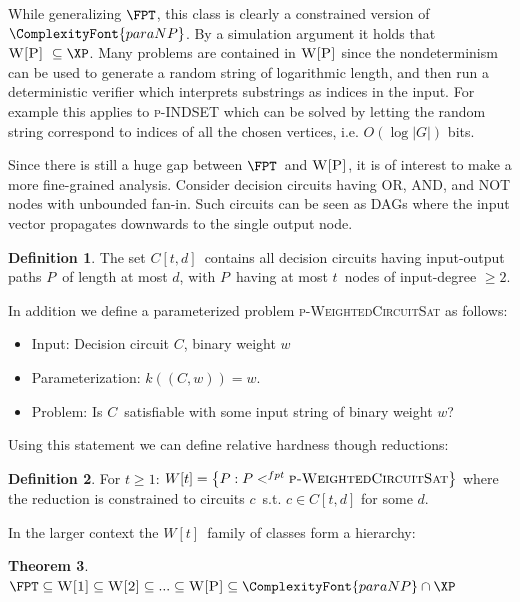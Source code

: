 \documentclass[a4paper,11pt]{report}
\theoremstyle{plain}
\newtheorem{thm}{Theorem}[chapter] %
\theoremstyle{definition}
\newtheorem{defn}[thm]{Definition} %
\newcommand{\PARANP}{\ComplexityFont{paraNP}}
\begin{document}
While generalizing $\FPT$, this class is clearly a constrained version of $\PARANP$.
By a simulation argument \cite{FG06} it holds that $\textsc{W[P]} \subseteq \XP$.
Many problems are contained in $\textsc{W[P]}$ since the nondeterminism can be used to generate a random string of logarithmic length, and then run a deterministic verifier which
interprets substrings as indices in the input.
For example this applies to \textsc{p-INDSET} which can be solved by letting the random string correspond to indices of all the chosen vertices, i.e. $O(\log |G|)$ bits.

Since there is still a huge gap between $\FPT$ and $\textsc{W[P]}$, it is of interest to make a more fine-grained analysis.
Consider decision circuits having OR, AND, and NOT nodes with unbounded fan-in.
Such circuits can be seen as DAGs where the input vector propagates downwards to the single output node.

\begin{defn}
The set $C[t, d]$ contains all decision circuits having input-output paths $P$ of length at most $d$, with $P$ having at most $t$ nodes of input-degree $\ge 2$.
\end{defn}

In addition we define a parameterized problem \textsc{p-WeightedCircuitSat} as follows:
\begin{itemize}
\item Input: Decision circuit $C$, binary weight $w$
\item Parameterization: $k((C, w)) = w$.
\item Problem: Is $C$ satisfiable with some input string of binary weight $w$?
\end{itemize}

Using this statement we can define relative hardness though reductions:

\begin{defn}
For $t \ge 1$: $W[t] = \left\{P : P <^{fpt} \textsc{p-WeightedCircuitSat} \right\}$ where the reduction is constrained to circuits $c$ s.t. $c \in C[t, d]$ for some $d$.
\end{defn}


In the larger context the $W[t]$ family of classes form a hierarchy:

\begin{thm}
$\FPT \subseteq \textsc{W[1]} \subseteq \textsc{W[2]} \subseteq ...  \subseteq \textsc{W[P]} \subseteq \PARANP \cap \XP$
\end{thm}
\end{document}
